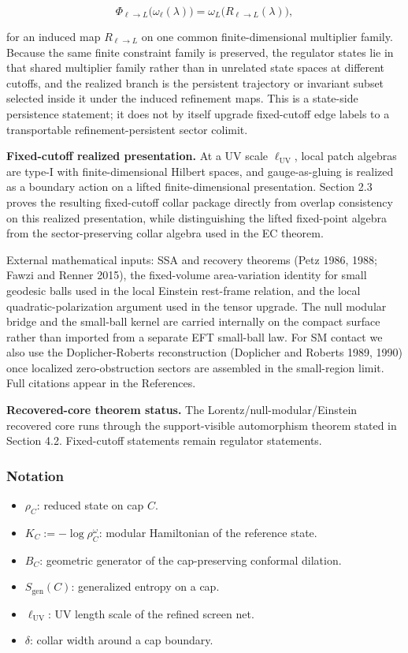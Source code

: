 \[
\Phi_{\ell\to L}\bigl(\omega_{\ell}(\lambda)\bigr)=\omega_{L}\!\bigl(R_{\ell\to L}(\lambda)\bigr),
\]

for an induced map \(R_{\ell\to L}\) on one common finite-dimensional multiplier family. Because the same finite constraint family is preserved, the regulator states lie in that shared multiplier family rather than in unrelated state spaces at different cutoffs, and the realized branch is the persistent trajectory or invariant subset selected inside it under the induced refinement maps. This is a state-side persistence statement; it does not by itself upgrade fixed-cutoff edge labels to a transportable refinement-persistent sector colimit.

\textbf{Fixed-cutoff realized presentation.} At a UV scale \(\ell_{\mathrm{UV}}\), local patch algebras are type-I with finite-dimensional Hilbert spaces, and gauge-as-gluing is realized as a boundary action on a lifted finite-dimensional presentation. Section 2.3 proves the resulting fixed-cutoff collar package directly from overlap consistency on this realized presentation, while distinguishing the lifted fixed-point algebra from the sector-preserving collar algebra used in the EC theorem.

External mathematical inputs: SSA and recovery theorems (Petz 1986, 1988; Fawzi and Renner 2015), the fixed-volume area-variation identity for small geodesic balls used in the local Einstein rest-frame relation, and the local quadratic-polarization argument used in the tensor upgrade. The null modular bridge and the small-ball kernel are carried internally on the compact surface rather than imported from a separate EFT small-ball law. For SM contact we also use the Doplicher-Roberts reconstruction (Doplicher and Roberts 1989, 1990) once localized zero-obstruction sectors are assembled in the small-region limit. Full citations appear in the References.

\textbf{Recovered-core theorem status.} The Lorentz/null-modular/Einstein recovered core runs through the support-visible automorphism theorem stated in Section 4.2. Fixed-cutoff statements remain regulator statements.

\subsubsection{Notation}\label{15-notation}

\begin{itemize}
\tightlist
\item
  \(\rho_C\): reduced state on cap \(C\).
\item
  \(K_C := -\log \rho_C^{\omega}\): modular Hamiltonian of the reference state.
\item
  \(B_C\): geometric generator of the cap-preserving conformal dilation.
\item
  \(S_{\mathrm{gen}}(C)\): generalized entropy on a cap.
\item
  \(\ell_{\mathrm{UV}}\): UV length scale of the refined screen net.
\item
  \(\delta\): collar width around a cap boundary.
\end{itemize}

